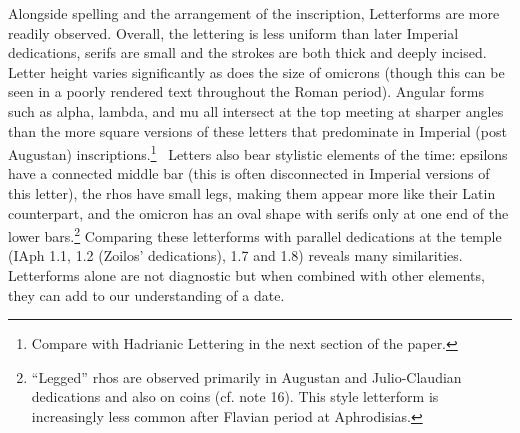 \documentclass[amsthm,ebook]{saparticle}
\begin{document}
Alongside spelling and the arrangement of the inscription, Letterforms are more readily observed. Overall, the lettering
is less uniform than later Imperial dedications, serifs are small and the strokes are both thick and deeply incised.
Letter height varies significantly as does the size of omicrons (though this can be seen in a poorly rendered text
throughout the Roman period). Angular forms such as alpha, lambda, and mu all intersect at the top meeting at sharper
angles than the more square versions of these letters that predominate in Imperial (post Augustan)
inscriptions.\footnote{ Compare with Hadrianic Lettering in the next section of the paper.} \ Letters also bear
stylistic elements of the time: epsilons have a connected middle bar (this is often disconnected in Imperial versions
of this letter), the rhos have small legs, making them appear more like their Latin counterpart, and the omicron has an
oval shape with serifs only at one end of the lower bars.\footnote{ ``Legged'' rhos are observed primarily in Augustan
and Julio-Claudian dedications and also on coins (cf. note 16). This style letterform is increasingly less common after
Flavian period at Aphrodisias. } Comparing these letterforms with parallel dedications at the temple (IAph 1.1, 1.2
(Zoilos’ dedications), 1.7 and 1.8) reveals many similarities. Letterforms alone are not diagnostic but when combined
with other elements, they can add to our understanding of a date. 
\end{document}
